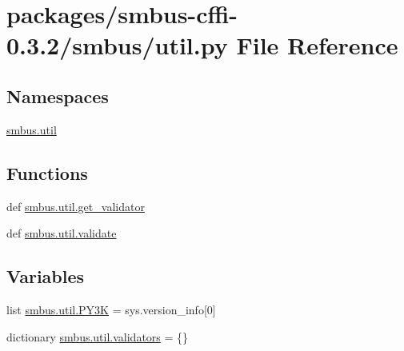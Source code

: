 \hypertarget{smbus-cffi-0_83_82_2smbus_2util_8py}{}\section{packages/smbus-\/cffi-\/0.3.2/smbus/util.py File Reference}
\label{smbus-cffi-0_83_82_2smbus_2util_8py}
\subsection*{Namespaces}
\begin{DoxyCompactItemize}
\item 
 \hyperlink{namespacesmbus_1_1util}{smbus.\+util}
\end{DoxyCompactItemize}
\subsection*{Functions}
\begin{DoxyCompactItemize}
\item 
def \hyperlink{namespacesmbus_1_1util_a8bc0535885c298354c53967cc1cfb17a}{smbus.\+util.\+get\+\_\+validator}
\item 
def \hyperlink{namespacesmbus_1_1util_a1cfa178b03439c0f6ac8ab2c8859ce0f}{smbus.\+util.\+validate}
\end{DoxyCompactItemize}
\subsection*{Variables}
\begin{DoxyCompactItemize}
\item 
list \hyperlink{namespacesmbus_1_1util_a54fe0aa255d552912f46d6e1e5dfc204}{smbus.\+util.\+P\+Y3\+K} = sys.\+version\+\_\+info\mbox{[}0\mbox{]}
\item 
dictionary \hyperlink{namespacesmbus_1_1util_a894d26b5458cfdfbf134976dcbdd7f0c}{smbus.\+util.\+validators} = \{\}
\end{DoxyCompactItemize}
